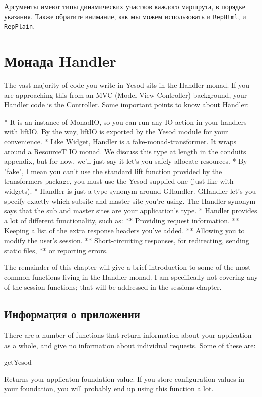Аргументы имеют типы динамических участков каждого маршрута, в порядке
указания. Также обратите внимание, как мы можем использовать и
\lstinline!RepHtml!, и \lstinline!RepPlain!.

\section{Монада Handler}

The vast majority of code you write in Yesod sits in the Handler
monad. If you are approaching this from an MVC (Model-View-Controller)
background, your Handler code is the Controller. Some important points
to know about Handler:

* It is an instance of MonadIO, so you can run any IO action in your
handlers with liftIO. By the way, liftIO is exported by the Yesod
module for your convenience.
* Like Widget, Handler is a fake-monad-transformer. It wraps around a
ResourceT IO monad. We discuss this type at length in the conduits
appendix, but for now, we'll just say it let's you safely allocate
resources.
* By "fake", I mean you can't use the standard lift function provided
by the transformers package, you must use the Yesod-supplied one (just
like with widgets).
* Handler is just a type synonym around GHandler. GHandler let's you
specify exactly which subsite and master site you're using. The
Handler synonym says that the sub and master sites are your
application's type.
* Handler provides a lot of different functionality, such as:
** Providing request information.
** Keeping a list of the extra response headers you've added.
** Allowing you to modify the user's session.
** Short-circuiting responses, for redirecting, sending static files,
** or reporting errors.

The remainder of this chapter will give a brief introduction to some
of the most common functions living in the Handler monad. I am
specifically not covering any of the session functions; that will be
addressed in the sessions chapter.

\subsection{Информация о приложении}

There are a number of functions that return information about your
application as a whole, and give no information about individual
requests. Some of these are:

getYesod

Returns your applicaton foundation value. If you store configuration
values in your foundation, you will probably end up using this
function a lot.

